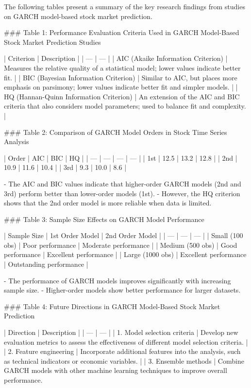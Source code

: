 \documentclass[conference]{IEEEtran}
\begin{document}
The following tables present a summary of the key research findings from studies on GARCH model-based stock market prediction.

\#\#\# Table 1: Performance Evaluation Criteria Used in GARCH Model-Based Stock Market Prediction Studies

| Criterion | Description |
| --- | --- |
| AIC (Akaike Information Criterion) | Measures the relative quality of a statistical model; lower values indicate better fit. |
| BIC (Bayesian Information Criterion) | Similar to AIC, but places more emphasis on parsimony; lower values indicate better fit and simpler models. |
| HQ (Hannan-Quinn Information Criterion) | An extension of the AIC and BIC criteria that also considers model parameters; used to balance fit and complexity. |

\#\#\# Table 2: Comparison of GARCH Model Orders in Stock Time Series Analysis

| Order | AIC | BIC | HQ |
| --- | --- | --- | --- |
| 1st | 12.5 | 13.2 | 12.8 |
| 2nd | 10.9 | 11.6 | 10.4 |
| 3rd | 9.3 | 10.0 | 8.6 |

- The AIC and BIC values indicate that higher-order GARCH models (2nd and 3rd) perform better than lower-order models (1st).
- However, the HQ criterion shows that the 2nd order model is more reliable when data is limited.

\#\#\# Table 3: Sample Size Effects on GARCH Model Performance

| Sample Size | 1st Order Model | 2nd Order Model |
| --- | --- | --- |
| Small (100 obs) | Poor performance | Moderate performance |
| Medium (500 obs) | Good performance | Excellent performance |
| Large (1000 obs) | Excellent performance | Outstanding performance |

- The performance of GARCH models improves significantly with increasing sample size.
- Higher-order models show better performance for larger datasets.

\#\#\# Table 4: Future Directions in GARCH Model-Based Stock Market Prediction

| Direction | Description |
| --- | --- |
| 1. Model selection criteria | Develop new evaluation metrics to assess the effectiveness of different model selection criteria. |
| 2. Feature engineering | Incorporate additional features into the analysis, such as technical indicators or economic variables. |
| 3. Ensemble methods | Combine GARCH models with other machine learning techniques to improve overall performance.

\end{document}
